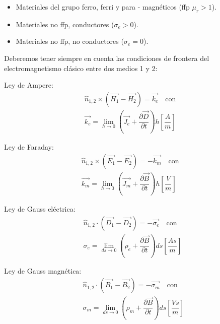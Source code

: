 \begin{itemize}
	\item Materiales del grupo ferro, ferri y para - magnéticos (ffp $\mu_{r}>1$). 	
	\item Materiales no ffp, conductores ($\sigma_{e}>0$).
	\item Materiales no ffp, no conductores ($\sigma_{e}=0$).	
\end{itemize}


Deberemos tener siempre en cuenta las condiciones de frontera del electromagnetismo clásico entre dos medios 1 y 2:

Ley de Ampere:
\begin{equation}
\begin{aligned}
	&\hat{n}_{1,2} \times(\overrightarrow{H_{1}}-\overrightarrow{H_{2}})  = \overrightarrow{k_{e}} \quad \text{con}  \quad	\\
	&\overrightarrow{k_{e}}=\lim_{h\rightarrow 0} 	\left(\overrightarrow{J_{e}}+\dfrac{\partial \overrightarrow{D}}{\partial t} \right) h \left[ \dfrac{A}{m}\right] 
\end{aligned}
\end{equation}

Ley de Faraday:
\begin{equation}
\begin{aligned}
	& \hat{n}_{1,2} \times(\overrightarrow{E_{1}}-\overrightarrow{E_{2}}) = -\overrightarrow{k_{m}} \quad \text{con}  \quad	\\
	&\overrightarrow{k_{m}}=\lim_{h\rightarrow 0} 	\left(\overrightarrow{J_{m}}+\dfrac{\partial \overrightarrow{B}}{\partial t} \right) h \left[ \dfrac{V}{m}\right] 
\end{aligned}
\end{equation}

Ley de Gauss eléctrica:
\begin{equation}
\begin{aligned}
	& \hat{n}_{1,2} \cdot (\overrightarrow{D_{1}}-\overrightarrow{D_{2}}) = -\overrightarrow{\sigma_{e}} \quad \text{con}  \quad	\\
	&\sigma_{e}=\lim_{ds\rightarrow 0} 	\left(\rho_{e}+\dfrac{\partial \overrightarrow{B}}{\partial t} \right) ds \left[ \dfrac{As}{m}\right] 
\end{aligned}
\end{equation}

Ley de Gauss magnética: 
\begin{equation}
\begin{aligned}
	& \hat{n}_{1,2} \cdot (\overrightarrow{B_{1}}-\overrightarrow{B_{2}}) = -\overrightarrow{\sigma_{m}} \quad \text{con}  \quad	\\
	&\sigma_{m}=\lim_{ds\rightarrow 0} 	\left(\rho_{m}+\dfrac{\partial \overrightarrow{B}}{\partial t} \right) ds \left[ \dfrac{Vs}{m}\right] 
\end{aligned}
\end{equation}

